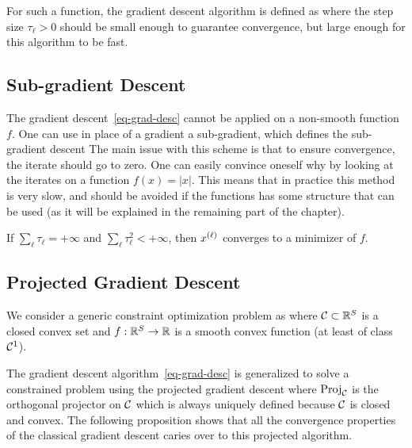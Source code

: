 For such a function, the gradient descent algorithm is defined as
where the step size $\tau_\ell>0$ should be small enough to guarantee convergence, but large enough for this algorithm to be fast.


\subsection{Sub-gradient Descent}

The gradient descent~\eqref{eq-grad-desc} cannot be applied on a non-smooth function $f$. One can use in place of a gradient a sub-gradient, which defines the sub-gradient descent
The main issue with this scheme is that to ensure convergence, the iterate should go to zero. One can easily convince oneself why by looking at the iterates on a function $f(x)=|x|$. This means that in practice this method is very slow, and should be avoided if the functions has some structure that can be used (as it will be explained in the remaining part of the chapter).

\begin{thm}
	If $\sum_{\ell} \tau_\ell=+\infty$ and $\sum_{\ell} \tau_\ell^2 < +\infty$, then $\it{x}$ converges to a minimizer of $f$. 
\end{thm}

\subsection{Projected Gradient Descent}
\label{sec-proj-grad}

We consider a generic constraint optimization problem as
where $\Cc \subset \RR^S$ is a closed convex set and $f : \RR^S \rightarrow \RR$ is a smooth convex function (at least of class $\Cc^1$). 

The gradient descent algorithm~\eqref{eq-grad-desc} is generalized to solve a constrained problem using the projected gradient descent 
where $\Proj_\Cc$ is the orthogonal projector on $\Cc$
which is always uniquely defined because $\Cc$ is closed and convex.
%
The following proposition shows that all the convergence properties of the classical gradient descent caries over to this projected algorithm.

